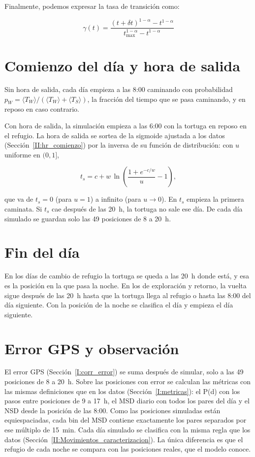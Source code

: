 Finalmente, podemos expresar la tasa de transición como:

\begin{equation}
    \gamma (t)=\frac{(t+\delta t)^{1-\alpha}-t^{1-\alpha}}{t_{\text{max}}^{1-\alpha}-t^{1-\alpha}} 
\end{equation}

\section*{Comienzo del día y hora de salida}

Sin hora de salida, cada día empieza a las 8:00 caminando con probabilidad $p_W = \langle T_W \rangle / (\langle T_W \rangle + \langle T_S \rangle)$, la fracción 
del tiempo que se pasa caminando, y en reposo en caso contrario.

Con hora de salida, la simulación empieza a las 6:00 con la tortuga en reposo en el refugio. La hora de salida se sortea de la sigmoide ajustada a los datos 
(Sección~\ref{II:hr_comienzo}) por la inversa de su función de distribución: con $u$ uniforme en $(0,1]$,

\begin{equation}
    t_s = c + w\,\ln\!\left(\frac{1 + e^{-c/w}}{u} - 1\right),
\end{equation}

que va de $t_s = 0$ (para $u = 1$) a infinito (para $u \to 0$). En $t_s$ empieza la primera caminata. Si $t_s$ cae después de las 20~h, la tortuga no sale ese día. 
De cada día simulado se guardan solo las 49 posiciones de 8 a 20~h.


\section*{Fin del día}

En los días de cambio de refugio la tortuga se queda a las 20~h donde está, y esa es la posición en la que pasa la noche. En los de exploración y retorno, 
la vuelta sigue después de las 20~h hasta que la tortuga llega al refugio o hasta las 8:00 del día siguiente. Con la posición de la noche se clasifica el día y
empieza el día siguiente.

\section*{Error GPS y observación}

El error GPS (Sección~\ref{I:corr_error}) se suma después de simular, solo a las 49 posiciones de 8 a 20~h. Sobre las posiciones con error se calculan las métricas
con las mismas definiciones que en los datos (Sección~\ref{I:metricas}): el P(d) con los pasos entre posiciones de 9 a 17~h, el MSD diario con todos los pares del 
día y el NSD desde la posición de las 8:00. Como las posiciones simuladas están equiespaciadas, cada bin del MSD contiene exactamente los pares separados por ese 
múltiplo de 15~min. Cada día simulado se clasifica con la misma regla que los datos (Sección~\ref{II:Movimientos_caracterizacion}). La única diferencia es que el refugio de 
cada noche se compara con las posiciones reales, que el modelo conoce.

